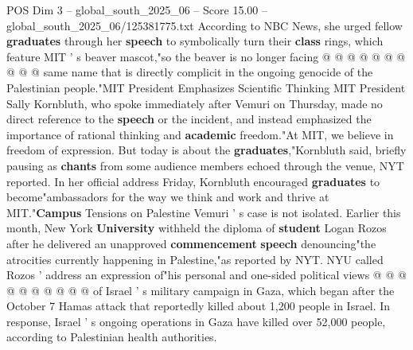 \begin{textsample}{POS Dim 3 – global\_south\_2025\_06 – Score 15.00 – global\_south\_2025\_06/125381775.txt}
According to NBC News, she urged fellow \textbf{graduates} through her \textbf{speech} to symbolically turn their \textbf{class} rings, which feature MIT ' s beaver mascot,"so the beaver is no longer facing @ @ @ @ @ @ @ @ @ @ same name that is directly complicit in the ongoing genocide of the Palestinian people."MIT President Emphasizes Scientific Thinking MIT President Sally Kornbluth, who spoke immediately after Vemuri on Thursday, made no direct reference to the \textbf{speech} or the incident, and instead emphasized the importance of rational thinking and \textbf{academic} freedom."At MIT, we believe in freedom of expression.
But today is about the \textbf{graduates},"Kornbluth said, briefly pausing as \textbf{chants} from some audience members echoed through the venue, NYT reported.
In her official address Friday, Kornbluth encouraged \textbf{graduates} to become"ambassadors for the way we think and work and thrive at MIT."\textbf{Campus} Tensions on Palestine Vemuri ' s case is not isolated.
Earlier this month, New York \textbf{University} withheld the diploma of \textbf{student} Logan Rozos after he delivered an unapproved \textbf{commencement} \textbf{speech} denouncing"the atrocities currently happening in Palestine,"as reported by NYT.
NYU called Rozos ' address an expression of"his personal and one-sided political views @ @ @ @ @ @ @ @ @ @ of Israel ' s military campaign in Gaza, which began after the October 7 Hamas attack that reportedly killed about 1,200 people in Israel.
In response, Israel ' s ongoing operations in Gaza have killed over 52,000 people, according to Palestinian health authorities.

\end{textsample}
